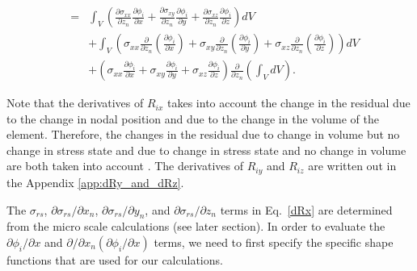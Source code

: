 \begin{eqnarray}
&=& \int_V \left(\frac{\partial \sigma_{xx}}{\partial z_n}\frac{\partial \phi_i}{\partial x} +\frac{\partial \sigma_{xy}}{\partial z_n} \frac{\partial \phi_i}{\partial y} + \frac{\partial \sigma_{xz}}{\partial z_n}\frac{\partial \phi_i}{\partial z}  \right) dV \nonumber\\
&&+ \int_V \left(\sigma_{xx} \frac{\partial}{\partial z_n} \left(\frac{\partial \phi_i}{\partial x}\right)+ \sigma_{xy} \frac{\partial}{\partial z_n} \left(\frac{\partial \phi_i}{\partial y}\right) + \sigma_{xz} \frac{\partial}{\partial z_n} \left(\frac{\partial \phi_i}{\partial z}\right) \right) dV \nonumber\\
&& + \left(  \sigma_{xx} \frac{\partial \phi_i}{\partial x} + \sigma_{xy} \frac{\partial \phi_i}{\partial y} + \sigma_{xz} \frac{\partial \phi_i}{\partial z} \right) \frac{\partial}{\partial z_n} \left(\int_V dV \right).
\label{dRx}
\end{eqnarray}
%

Note that the derivatives of $R_{ix}$ takes into account the change in the residual due to the change in nodal position and due to the change in the volume of the element. Therefore, the changes in the residual due to change in volume but no change in stress state and due to change in stress state and no change in volume are both taken into account . The derivatives of $R_{iy}$ and $R_{iz}$ are written out in the Appendix \ref{app:dRy_and_dRz}.

The $\sigma_{rs}$, $\partial \sigma_{rs}/\partial x_n$, $\partial \sigma_{rs}/\partial y_n$, and $\partial \sigma_{rs}/\partial z_n$ terms in Eq.\ \eqref{dRx} are determined from the micro scale calculations (see later section). In order to evaluate the $\partial \phi_i/\partial x$ and $\partial /\partial x_n (\partial \phi_i/\partial x)$ terms, we need to first specify the specific shape functions that are used for our calculations.

